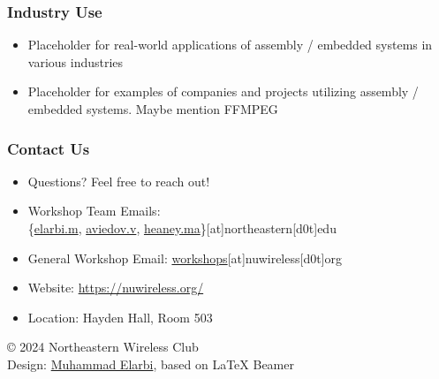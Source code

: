 \documentclass{beamer}
\begin{document}
\begin{frame}
    \frametitle{Industry Use}
    \begin{itemize}
        \item Placeholder for real-world applications of assembly / embedded systems in various industries
        \item Placeholder for examples of companies and projects utilizing assembly / embedded systems. Maybe mention FFMPEG
    \end{itemize}
\end{frame}


\begin{frame}
    \frametitle{Contact Us}
    \begin{itemize}
        \item Questions? Feel free to reach out!
        \item Workshop Team Emails: \\
        \{\href{mailto:elarbi.m@northeastern.edu}{elarbi.m}, 
        \href{mailto:aviedov.v@northeastern.edu}{aviedov.v}, 
        \href{mailto:heaney.ma@northeastern.edu}{heaney.ma}\}[at]northeastern[d0t]edu
        \item General Workshop Email: \href{mailto:workshops@nuwireless.org}{workshops}[at]nuwireless[d0t]org
        \item Website: \url{https://nuwireless.org/}
        \item Location: Hayden Hall, Room 503
    \end{itemize}
    \vspace{1cm}
    \begin{flushright}
        \footnotesize{© 2024 Northeastern Wireless Club} \\
        \footnotesize{Design: \href{https://melarbi.com}{Muhammad Elarbi}, based on LaTeX Beamer}
    \end{flushright}
\end{frame}

\end{document}
